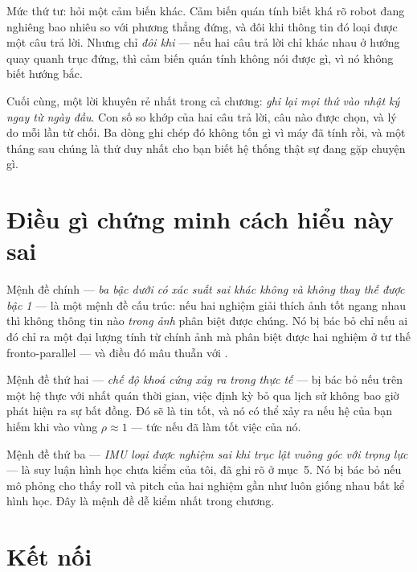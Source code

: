 \documentclass[../../marker.tex]{subfiles}
\begin{document}
\begin{dongian}
Mức thứ tư: hỏi một cảm biến khác. Cảm biến quán tính biết khá rõ robot đang nghiêng bao nhiêu so với phương thẳng đứng, và đôi khi thông tin đó loại được một câu trả lời. Nhưng chỉ \emph{đôi khi} --- nếu hai câu trả lời chỉ khác nhau ở hướng quay quanh trục đứng, thì cảm biến quán tính không nói được gì, vì nó không biết hướng bắc.

Cuối cùng, một lời khuyên rẻ nhất trong cả chương: \emph{ghi lại mọi thứ vào nhật ký ngay từ ngày đầu}. Con số so khớp của hai câu trả lời, câu nào được chọn, và lý do mỗi lần từ chối. Ba dòng ghi chép đó không tốn gì vì máy đã tính rồi, và một tháng sau chúng là thứ duy nhất cho bạn biết hệ thống thật sự đang gặp chuyện gì.

\end{dongian}

\section{Điều gì chứng minh cách hiểu này sai}

Mệnh đề chính --- \emph{ba bậc dưới có xác suất sai khác không và không thay thế được bậc 1} --- là một mệnh đề cấu trúc: nếu hai nghiệm giải thích ảnh tốt ngang nhau thì không thông tin nào \emph{trong ảnh} phân biệt được chúng. Nó bị bác bỏ chỉ nếu ai đó chỉ ra một đại lượng tính từ chính ảnh mà phân biệt được hai nghiệm ở tư thế fronto-parallel --- và điều đó mâu thuẫn với .

Mệnh đề thứ hai --- \emph{chế độ khoá cứng xảy ra trong thực tế} --- bị bác bỏ nếu trên một hệ thực với nhất quán thời gian, việc định kỳ bỏ qua lịch sử không bao giờ phát hiện ra sự bất đồng. Đó sẽ là tin tốt, và nó có thể xảy ra nếu hệ của bạn hiếm khi vào vùng \(\rho \approx 1\) --- tức nếu  đã làm tốt việc của nó.

Mệnh đề thứ ba --- \emph{IMU loại được nghiệm sai khi trục lật vuông góc với trọng lực} --- là suy luận hình học chưa kiểm của tôi, đã ghi rõ ở mục~5. Nó bị bác bỏ nếu mô phỏng cho thấy roll và pitch của hai nghiệm gần như luôn giống nhau bất kể hình học. Đây là mệnh đề dễ kiểm nhất trong chương.

\section{Kết nối}
\end{document}
